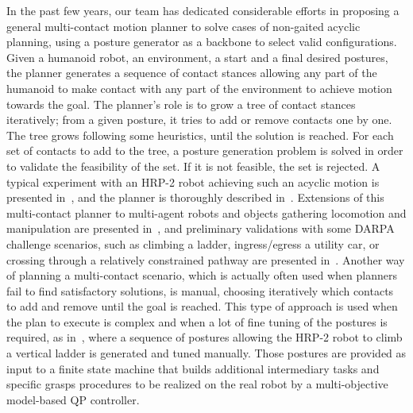 In the past few years, our team has dedicated considerable efforts in proposing a general multi-contact motion planner to solve cases of non-gaited acyclic planning, using a posture generator as a backbone to select valid configurations.
Given a humanoid robot, an environment, a start and a final desired postures, the planner generates a sequence of contact stances allowing any part of the humanoid to make contact with any part of the environment to achieve motion towards the goal.
The planner's role is to grow a tree of contact stances iteratively; from a given posture, it tries to add or remove contacts one by one.
The tree grows following some heuristics, until the solution is reached.
For each set of contacts to add to the tree, a posture generation problem is solved in order to validate the feasibility of the set. If it is not feasible, the set is rejected.
A typical experiment with an HRP-2 robot achieving such an acyclic motion is presented in~\cite{escande:iser:2008}, and the planner is thoroughly described in~\cite{escande:ras:2013}.
Extensions of this multi-contact planner to multi-agent robots and objects gathering locomotion and manipulation are presented in~\cite{bouyarmane:ar:2012}, and preliminary validations with some DARPA challenge scenarios, such as climbing a ladder, ingress/egress a utility car, or crossing through a relatively constrained pathway are presented in~\cite{bouyarmane:humanoids:2012}.
Another way of planning a multi-contact scenario, which is actually often used when planners fail to find satisfactory solutions, is manual, choosing iteratively which contacts to add and remove until the goal is reached.
This type of approach is used when the plan to execute is complex and when a lot of fine tuning of the postures is required, as in~\cite{vaillant:autonomousrobots:2016}, where a sequence of postures allowing the HRP-2 robot to climb a vertical ladder is generated and tuned manually.
Those postures are provided as input to a finite state machine that builds additional intermediary tasks and specific grasps procedures to be realized on the real robot by a multi-objective model-based QP controller.

